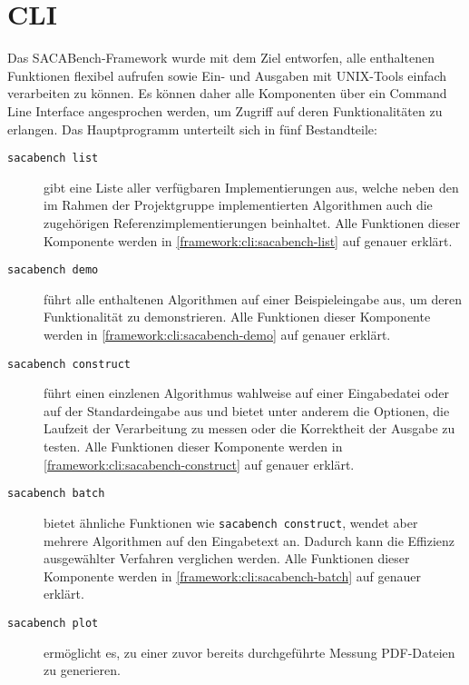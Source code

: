 \section{CLI}

\newcommand{\sacabench}{SACABench\xspace}
\newcommand{\termfont}[1]{\texttt{#1}}

Das  \sacabench-Framework wurde mit dem Ziel entworfen, alle enthaltenen Funktionen flexibel aufrufen sowie Ein- und Ausgaben mit UNIX-Tools einfach verarbeiten zu können.
Es können daher alle Komponenten über ein Command Line Interface angesprochen werden, um Zugriff auf deren Funktionalitäten zu erlangen.
Das Hauptprogramm unterteilt sich in fünf Bestandteile:
\begin{description}
    \item[\termfont{sacabench list}] gibt eine Liste aller verfügbaren Implementierungen aus, welche neben den im Rahmen der Projektgruppe implementierten Algorithmen auch die zugehörigen Referenzimplementierungen beinhaltet.
        Alle Funktionen dieser Komponente werden in \cref{framework:cli:sacabench-list} auf  genauer erklärt.
    \item[\termfont{sacabench demo}] führt alle enthaltenen Algorithmen auf einer Beispieleingabe aus, um deren Funktionalität zu demonstrieren.
        Alle Funktionen dieser Komponente werden in \cref{framework:cli:sacabench-demo} auf  genauer erklärt.
    \item[\termfont{sacabench construct}] führt einen einzlenen Algorithmus wahlweise auf einer Eingabedatei oder auf der Standardeingabe aus und bietet unter anderem die Optionen, die Laufzeit der Verarbeitung zu messen oder die Korrektheit der Ausgabe zu testen. Alle Funktionen dieser Komponente werden in \cref{framework:cli:sacabench-construct} auf  genauer erklärt.
    \item[\termfont{sacabench batch}] bietet ähnliche Funktionen wie \termfont{sacabench construct}, wendet aber mehrere Algorithmen auf den Eingabetext an. Dadurch kann die Effizienz ausgewählter Verfahren verglichen werden. Alle Funktionen dieser Komponente werden in \cref{framework:cli:sacabench-batch} auf  genauer erklärt.
    \item[\termfont{sacabench plot}] ermöglicht es, zu einer zuvor bereits durchgeführte Messung PDF-Dateien zu generieren.
\end{description}








